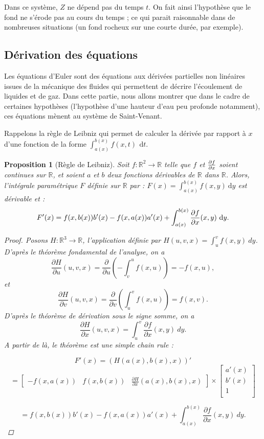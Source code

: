 \documentclass[
11pt, %
francais, %
singlespacing, %
headsepline, %
f%
]{MastersDoctoralThesis} %
\newtheorem{prop}{Proposition}
\theoremstyle{definition}
\begin{document}
Dans ce système, $Z$ ne dépend pas du temps $t$. On
fait ainsi l'hypothèse que le fond ne s'érode pas au cours du temps ; ce qui parait raisonnable dans de nombreuses situations (un fond rocheux sur une courte durée, par exemple).

\subsection{Dérivation des équations}

Les équations d'Euler sont des équations aux dérivées partielles non linéaires issues de la mécanique des fluides qui permettent de décrire l'écoulement de liquides et de gaz.
Dans cette partie, nous allons montrer que dans le cadre de certaines hypothèses (l'hypothèse d'une hauteur d'eau peu profonde notamment), ces équations mènent au système de Saint-Venant.

Rappelons la règle de Leibniz \cite{W1} qui permet de calculer la dérivée par rapport à $x$ d'une fonction de la forme $\int_{a(x)}^{b(x)} f(x,t)\,~\mathrm dt$.

\begin{prop}[Règle de Leibniz]
Soit $f : \mathbb{R}^{2} \rightarrow\mathbb{R}$ telle que $f$ et ${\partial f\over\partial x}$ soient continues sur $\mathbb{R}$, et soient $a$ et $b$ deux fonctions dérivables de $\mathbb{R}$ dans $\mathbb{R}$. Alors, l'intégrale paramétrique $F$ définie sur $\mathbb{R}$ par : $F(x)=\int_{a(x)}^{b(x)}f(x,y)~\mathrm dy$ est dérivable et :
\begin{equation}
F'(x)=f(x, b(x))b'(x)-f(x,a(x))a'(x)+\int_{a(x)}^{b(x)}{\partial f\over \partial x}(x,y)~\mathrm dy.
\end{equation}
\begin{proof}
Posons $H: \mathbb{R}^{3}\rightarrow\mathbb{R}$, l'application définie par $H(u,v,x)=\int_{u}^{v}f(x,y)~dy$. D'après le théorème fondamental de l'analyse, on a $$\frac{\partial H}{\partial u}(u,v,x)=\frac{\partial}{\partial u}(-\int_{v}^{u}f(x,u))=-f(x,u),$$ et $$\frac{\partial H}{\partial v}(u,v,x)=\frac{\partial}{\partial v}(\int_{u}^{v}f(x,u))=f(x,v).$$ D'après le théorème de dérivation sous le signe somme, on a $$ \frac{\partial H}{\partial x}(u,v,x)=\int_{u}^{v} \frac{\partial f}{\partial x}(x,y)~dy. $$ A partir de là, le théorème est une simple chain rule :

$$F'(x)=(H(a(x), b(x),x))'$$
$$=\begin{bmatrix} -f(x,a(x))&f(x,b(x))&\frac{\partial H}{\partial x}(a(x),b(x),x) \end{bmatrix} \times \begin{bmatrix}
a'(x)\\
b'(x)\\
1\\
\end{bmatrix}$$ 

$$= f(x,b(x))b'(x)-f(x,a(x))a'(x)+\int_{a(x)}^{b(x)} \frac{\partial f}{\partial x}(x,y)~dy.$$
\end{proof}
\end{prop}
\end{document}
